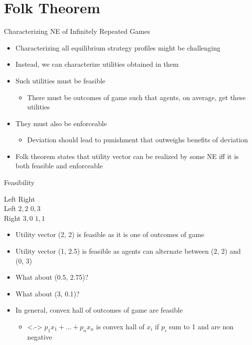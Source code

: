\documentclass[11pt,aspectratio=169]{beamer}
\begin{document}
  
 \section{Folk Theorem}  
  
  \begin{frame}{Characterizing NE of Infinitely Repeated Games}
   \begin{itemize}[<+->]
   \setlength{\itemsep}{0.7em}
    \item Characterizing all equilibrium strategy profiles might be challenging
    \item Instead, we can characterize utilities obtained in them
    \item Such utilities must be \alert{feasible}
    \begin{itemize}[<.->]
     \item There must be outcomes of game such that agents, on average, get these utilities
    \end{itemize}
    \item They must also be \alert{enforceable}
    \begin{itemize}[<.->]
     \item Deviation should lead to punishment that outweighs benefits of deviation
    \end{itemize}
    \item \alert{Folk theorem} states that utility vector can be realized by some NE iff it is both feasible and enforceable
   \end{itemize}
  \end{frame}
  
  
  \begin{frame}{Feasibility}
   \begin{center}
    \hspace{-2em}
    \begin{game}{2}{2}
     		\> Left		\> Right		\\
     Left	\> $2, 2$	\> $0, 3$	\\
     Right	\> $3, 0$	\> $1, 1$
    \end{game}
   \end{center}
   \begin{itemize}[<+->]
    \item Utility vector (2, 2) is feasible as it is one of outcomes of game
    \item Utility vector (1, 2.5) is feasible as agents can alternate between (2, 2) and (0, 3)
    \item What about (0.5, 2.75)?
    \item What about (3, 0.1)?
    \item In general, convex hall of outcomes of game are feasible
    \begin{itemize}
     \item<.-> $p_1x_1 + \dots + p_nx_n$ is convex hall of $x_i$ if $p_i$ sum to 1 and are non negative
    \end{itemize}
   \end{itemize}
  \end{frame}
\end{document}
